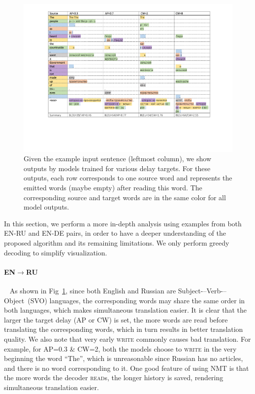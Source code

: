 \begin{figure}[hptb]
   	\centering
  	\includegraphics[width=\linewidth]{figs/simultrans/example_c2.pdf} 
          	\caption{\label{exp1} {Given the example input sentence (leftmost column), we show outputs by models trained for various delay targets. For these outputs, each row corresponds to one source word and represents the emitted words (maybe empty) after reading this word. The corresponding source and target words are in the same color for all model outputs.}}
\end{figure} 

In this section, we perform a more in-depth analysis using examples from both EN-RU and EN-DE pairs, in order to have a deeper understanding of the proposed algorithm and its remaining limitations. We only perform greedy decoding to simplify visualization. 

\paragraph{EN$\rightarrow$RU}~ As shown in Fig~\ref{exp1}, since both English and Russian are Subject-–Verb-–Object~(SVO) languages, the corresponding words may share the same order in both languages, which makes simultaneous translation easier. 
It is clear that the larger the target delay (AP or CW) is set, the more words are read before translating the corresponding words, which in turn results in better translation quality. 
We also note that very early \textsc{write} commonly causes bad translation. For example, for AP=0.3 \& CW=2, both the models choose to \textsc{write} in the very beginning the word ``The'', which is unreasonable since Russian has no articles, and there is no word corresponding to it. One good feature of using NMT is that the more words the decoder \textsc{read}s, the longer history is saved, rendering simultaneous translation easier.

